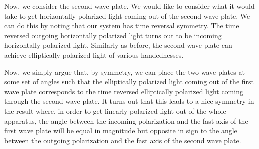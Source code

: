 Now, we consider the second wave plate. We would like to consider what it would take to get horizontally polarized light coming out of the second wave plate. We can do this by noting that our system has time reversal symmetry. The time reversed outgoing horizontally polarized light turns out to be incoming horizontally polarized light. Similarly as before, the second wave plate can achieve elliptically polarized light of various handednesses.

Now, we simply argue that, by symmetry, we can place the two wave plates at some set of angles such that the elliptically polarized light coming out of the first wave plate corresponds to the time reversed elliptically polarized light coming through the second wave plate. It turns out that this leads to a nice symmetry in the result where, in order to get linearly polarized light out of the whole apparatus, the angle between the incoming polarization and the fast axis of the first wave plate will be equal in magnitude but opposite in sign to the angle between the outgoing polarization and the fast axis of the second wave plate.

